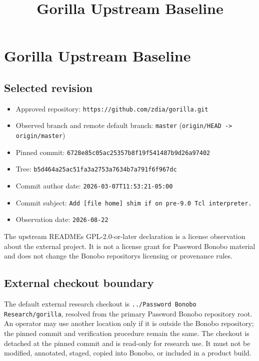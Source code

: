 \documentclass[
  letterpaper,
]{article}
\title{Gorilla Upstream Baseline}
\author{}
\date{}
\newcommand{\passthrough}[1]{#1}
\providecommand{\tightlist}{%
  \setlength{\itemsep}{0pt}\setlength{\parskip}{0pt}}
\begin{document}
\maketitle

{
\setcounter{tocdepth}{3}
\tableofcontents
}
\section{Gorilla Upstream Baseline}\label{gorilla-upstream-baseline}

\subsection{Selected revision}\label{selected-revision}

\begin{itemize}
\tightlist
\item
  Approved repository: \nolinkurl{https://github.com/zdia/gorilla.git}
\item
  Observed branch and remote default branch: \passthrough{\lstinline!master!}
  (\passthrough{\lstinline!origin/HEAD -> origin/master!})
\item
  Pinned commit: \nolinkurl{6728e85c05ac25357b8f19f541487b9d26a97402}
\item
  Tree: \nolinkurl{b5d464a25ac51fa3a2753a7634b7a791f6f967dc}
\item
  Commit author date: \nolinkurl{2026-03-07T11:53:21-05:00}
\item
  Commit subject: \passthrough{\lstinline!Add [file home] shim if on pre-9.0 Tcl interpreter.!}
\item
  Observation date: \nolinkurl{2026-08-22}
\end{itemize}

The upstream README\textquotesingle s GPL-2.0-or-later declaration is a license observation about the external project.
It is not a license grant for Password Bonobo material and does not change the Bonobo repository\textquotesingle s
licensing or provenance rules.

\subsection{External checkout boundary}\label{external-checkout-boundary}

The default external research checkout is \passthrough{\lstinline!../Password Bonobo Research/gorilla!}, resolved from
the primary Password Bonobo repository root. An operator may use another location only if it is outside the Bonobo
repository; the pinned commit and verification procedure remain the same. The checkout is detached at the pinned commit
and is read-only for research use. It must not be modified, annotated, staged, copied into Bonobo, or included in a
product build.
\end{document}
